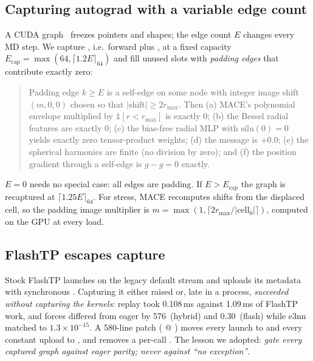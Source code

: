 \subsection{Capturing autograd with a variable edge count}
A CUDA graph~\cite{cudagraphs} freezes pointers and shapes; the edge count $E$ changes every MD step. We capture , i.e.\ forward plus , at a fixed capacity $E_{\text{cap}} = \max(64,\lceil1.2E\rceil_{64})$ and fill unused slots with \emph{padding edges} that contribute exactly zero:

\begin{quote}
Padding edge $k\ge E$ is a self-edge on some node with integer image shift $(m,0,0)$ chosen so that $|\text{shift}|\ge2r_{\max}$. Then (a) MACE's polynomial envelope multiplied by $\mathbb 1[r<r_{\max}]$ is exactly $0$; (b) the Bessel radial features are exactly $0$; (c) the bias-free radial MLP with $\mathrm{silu}(0)=0$ yields exactly zero tensor-product weights; (d) the message is $+0.0$; (e) the spherical harmonics are finite (no division by zero); and (f) the position gradient through a self-edge is $g-g=0$ exactly.
\end{quote}

$E=0$ needs no special case: all edges are padding. If $E>E_{\text{cap}}$ the graph is recaptured at $\lceil1.25E\rceil_{64}$. For stress, MACE recomputes shifts from the displaced cell, so the padding image multiplier is $m=\max(1,\lceil2r_{\max}/|\text{cell}_0|\rceil)$, computed on the GPU at every load.

\subsection{FlashTP escapes capture}
Stock FlashTP launches on the legacy default stream and uploads its metadata with synchronous . Capturing it either raised  or, late in a process, \emph{succeeded without capturing the kernels}: replay took 0.108\,ms against 1.09\,ms of FlashTP work, and forces differed from eager by 576\,\eVA{} (hybrid) and 0.30\,\eVA{} (flash) while e3nn matched to $1.3\times10^{-15}$. A 580-line patch ( @ ) moves every launch to  and every constant upload to , and removes a per-call . The lesson we adopted: \emph{gate every captured graph against eager parity; never against ``no exception''}.

